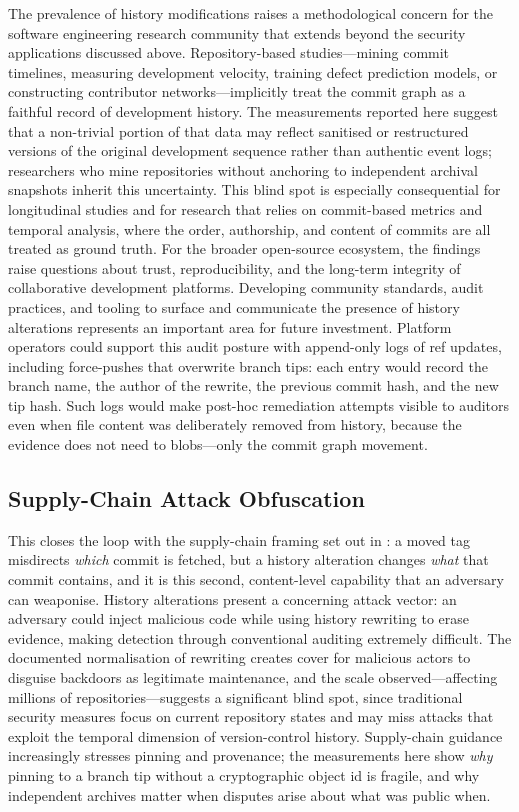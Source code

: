 The prevalence of history modifications raises a methodological concern for the software engineering research community that extends beyond the security applications discussed above.
Repository-based studies---mining commit timelines, measuring development velocity, training defect prediction models, or constructing contributor networks---implicitly treat the commit graph as a faithful record of development history.
The measurements reported here suggest that a non-trivial portion of that data may reflect sanitised or restructured versions of the original development sequence rather than authentic event logs; researchers who mine repositories without anchoring to independent archival snapshots inherit this uncertainty.
This blind spot is especially consequential for longitudinal studies and for research that relies on commit-based metrics and temporal analysis, where the order, authorship, and content of commits are all treated as ground truth.
For the broader open-source ecosystem, the findings raise questions about trust, reproducibility, and the long-term integrity of collaborative development platforms.
Developing community standards, audit practices, and tooling to surface and communicate the presence of history alterations represents an important area for future investment.
Platform operators could support this audit posture with append-only logs of ref updates, including force-pushes that overwrite branch tips: each entry would record the branch name, the author of the rewrite, the previous commit hash, and the new tip hash.
Such logs would make post-hoc remediation attempts visible to auditors even when file content was deliberately removed from history, because the evidence does not need to blobs---only the commit graph movement.

\subsection{Supply-Chain Attack Obfuscation}
\label{subsec:hist-disc-supplychain}

This closes the loop with the supply-chain framing set out in : a moved tag misdirects \emph{which} commit is fetched, but a history alteration changes \emph{what} that commit contains, and it is this second, content-level capability that an adversary can weaponise.
History alterations present a concerning attack vector: an adversary could inject malicious code while using history rewriting to erase evidence, making detection through conventional auditing extremely difficult.
The documented normalisation of rewriting creates cover for malicious actors to disguise backdoors as legitimate maintenance, and the scale observed---affecting millions of repositories---suggests a significant blind spot, since traditional security measures focus on current repository states and may miss attacks that exploit the temporal dimension of version-control history.
Supply-chain guidance increasingly stresses pinning and provenance; the measurements here show \emph{why} pinning to a branch tip without a cryptographic object id is fragile, and why independent archives matter when disputes arise about what was public when.

